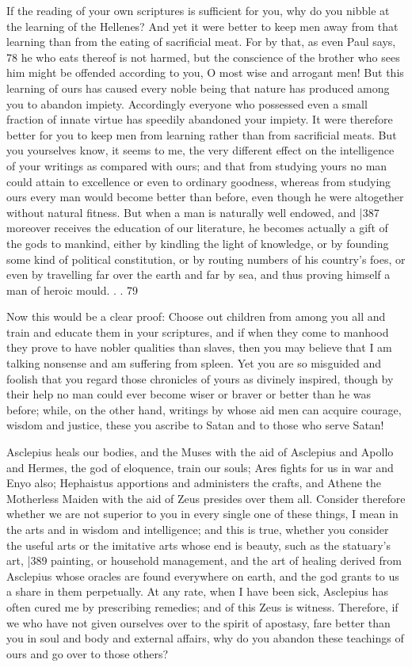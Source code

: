 If the reading of your own scriptures is sufficient for you, why do you nibble at the learning of the Hellenes? And yet it were better to keep men away from that learning than from the eating of sacrificial meat. For by that, as even Paul says, 78 he who eats thereof is not harmed, but the conscience of the brother who sees him might be offended according to you, O most wise and arrogant men! But this learning of ours has caused every noble being that nature has produced among you to abandon impiety. Accordingly everyone who possessed even a small fraction of innate virtue has speedily abandoned your impiety. It were therefore better for you to keep men from learning rather than from sacrificial meats. But you yourselves know, it seems to me, the very different effect on the intelligence of your writings as compared with ours; and that from studying yours no man could attain to excellence or even to ordinary goodness, whereas from studying ours every man would become better than before, even though he were altogether without natural fitness. But when a man is naturally well endowed, and
|387 moreover receives the education of our literature, he becomes actually a gift of the gods to mankind, either by kindling the light of knowledge, or by founding some kind of political constitution, or by routing numbers of his country's foes, or even by travelling far over the earth and far by sea, and thus proving himself a man of heroic mould. . .
79

Now this would be a clear proof: Choose out children from among you all and train and educate them in your scriptures, and if when they come to manhood they prove to have nobler qualities than slaves, then you may believe that I am talking nonsense and am suffering from spleen. Yet you are so misguided and foolish that you regard those chronicles of yours as divinely inspired, though by their help no man could ever become wiser or braver or better than he was before; while, on the other hand, writings by whose aid men can acquire courage, wisdom and justice, these you ascribe to Satan and to those who serve Satan!

Asclepius heals our bodies, and the Muses with the aid of Asclepius and Apollo and Hermes, the god of eloquence, train our souls; Ares fights for us in war and Enyo also; Hephaistus apportions and administers the crafts, and Athene the Motherless Maiden with the aid of Zeus presides over them all. Consider therefore whether we are not superior to you in every single one of these things, I mean in the arts and in wisdom and intelligence; and this is true, whether you consider the useful arts or the imitative arts whose end is beauty, such as the statuary's art,
|389 painting, or household management, and the art of healing derived from Asclepius whose oracles are found everywhere on earth, and the god grants to us a share in them perpetually. At any rate, when I have been sick, Asclepius has often cured me by prescribing remedies; and of this Zeus is witness. Therefore, if we who have not given ourselves over to the spirit of apostasy, fare better than you in soul and body and external affairs, why do you abandon these teachings of ours and go over to those others?

